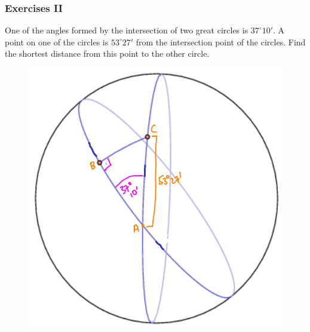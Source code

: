 \documentclass[xcolor=dvipsnames]{beamer}
\begin{document}
\begin{frame}
  \frametitle{Exercises II}
One of the angles formed by the intersection of two great circles is
$37^{\circ}10'$. A point on one of the circles is $53^{\circ}27'$ from
the intersection point of the circles. Find the shortest distance from
this point to the other circle.
\begin{figure}[h]
\includegraphics[scale=.3]{./cb.png}
\end{figure}
\end{frame}
\end{document}
